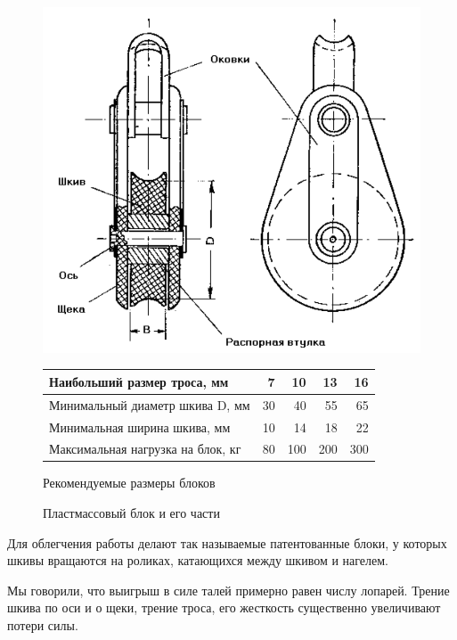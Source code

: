 \documentclass[a4paper, 12pt, twoside, final]{scrbook}
\begin{document}
\begin{figure}[htbp]
\begin{centering}
\includegraphics{pics/Platmassovyj_blok}
\par\end{centering}

\protect\caption{\label{fig:45}Пластмассовый блок и его части}


\bigskip{}


\begin{centering}
\begin{tabular}{|l|r|r|r|r|}
\hline 
Наибольший размер троса, мм & 7 & 10 & 13 & 16\tabularnewline
\hline 
Минимальный диаметр шкива D, мм & 30 & 40 & 55 & 65\tabularnewline
\hline 
Минимальная ширина шкива, мм & 10 & 14 & 18 & 22\tabularnewline
\hline 
Максимальная нагрузка на блок, кг & 80 & 100 & 200 & 300\tabularnewline
\hline 
\end{tabular}
\par\end{centering}

\bigskip{}


\centering{}Рекомендуемые размеры блоков
\end{figure}


Для облегчения работы делают так называемые патентованные блоки, у
которых шкивы вращаются на роликах, катающихся между шкивом и нагелем.

Мы говорили, что выигрыш в силе талей примерно равен числу лопарей.
Трение шкива по оси и о щеки, трение троса, его жесткость существенно
увеличивают потери силы.
\end{document}
